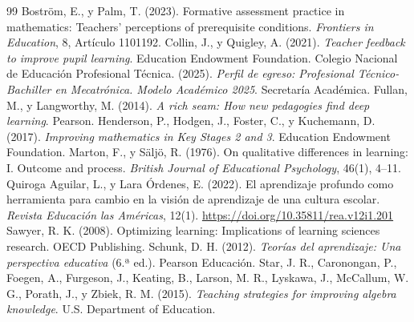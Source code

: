 \documentclass[spanish,letterpaper,oneside]{article}
\begin{document}
\clearpage
\begin{thebibliography}{99}
 Boström, E., y Palm, T. (2023). Formative assessment practice in mathematics: Teachers' perceptions of prerequisite conditions. \textit{Frontiers in Education}, 8, Artículo 1101192.
 Collin, J., y Quigley, A. (2021). \textit{Teacher feedback to improve pupil learning}. Education Endowment Foundation.
 Colegio Nacional de Educación Profesional Técnica. (2025). \textit{Perfil de egreso: Profesional Técnico-Bachiller en Mecatrónica. Modelo Académico 2025}. Secretaría Académica.
 Fullan, M., y Langworthy, M. (2014). \textit{A rich seam: How new pedagogies find deep learning}. Pearson.
 Henderson, P., Hodgen, J., Foster, C., y Kuchemann, D. (2017). \textit{Improving mathematics in Key Stages 2 and 3}. Education Endowment Foundation.
 Marton, F., y Säljö, R. (1976). On qualitative differences in learning: I. Outcome and process. \textit{British Journal of Educational Psychology}, 46(1), 4--11.
 Quiroga Aguilar, L., y Lara Órdenes, E. (2022). El aprendizaje profundo como herramienta para cambio en la visión de aprendizaje de una cultura escolar. \textit{Revista Educación las Américas}, 12(1). \url{https://doi.org/10.35811/rea.v12i1.201}
 Sawyer, R. K. (2008). Optimizing learning: Implications of learning sciences research. OECD Publishing.
 Schunk, D. H. (2012). \textit{Teorías del aprendizaje: Una perspectiva educativa} (6.ª ed.). Pearson Educación.
 Star, J. R., Caronongan, P., Foegen, A., Furgeson, J., Keating, B., Larson, M. R., Lyskawa, J., McCallum, W. G., Porath, J., y Zbiek, R. M. (2015). \textit{Teaching strategies for improving algebra knowledge}. U.S. Department of Education.
\end{thebibliography}
\end{document}
